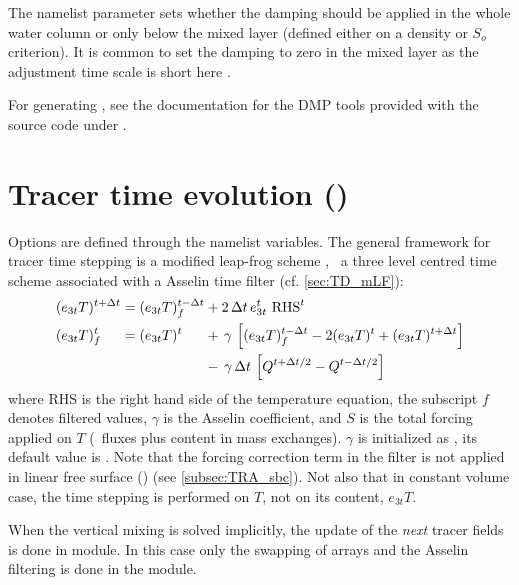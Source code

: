 \documentclass[../main/NEMO_manual]{subfiles}
\begin{document}
The namelist parameter  sets whether the damping should be applied in
the whole water column or only below the mixed layer (defined either on a density or $S_o$ criterion).
It is common to set the damping to zero in the mixed layer as the adjustment time scale is short here
\citep{madec.delecluse.ea_JPO96}.

For generating ,
see the documentation for the DMP tools provided with the source code under .

\section[Tracer time evolution (\textit{tranxt.F90})]{Tracer time evolution (\protect{})}
\label{sec:TRA_nxt}

Options are defined through the  namelist variables.
The general framework for tracer time stepping is a modified leap-frog scheme
\citep{leclair.madec_OM09}, \ie\ a three level centred time scheme associated with
a Asselin time filter (cf. \autoref{sec:TD_mLF}):
\begin{equation}
  \label{eq:TRA_nxt}
  \begin{alignedat}{5}
    &(e_{3t}T)^{t + \Delta t} &&= (e_{3t}T)_f^{t - \Delta t} &&+ 2 \, \Delta t \,e_{3t}^t \ \text{RHS}^t \\
    &(e_{3t}T)_f^t        &&= (e_{3t}T)^t            &&+ \, \gamma \, \left[ (e_{3t}T)_f^{t - \Delta t} - 2(e_{3t}T)^t + (e_{3t}T)^{t + \Delta t} \right] \\
    &                     &&                         &&- \, \gamma \, \Delta t \, \left[ Q^{t + \Delta t/2} - Q^{t - \Delta t/2} \right]
  \end{alignedat}
\end{equation}
where RHS is the right hand side of the temperature equation,
the subscript $f$ denotes filtered values, $\gamma$ is the Asselin coefficient,
and $S$ is the total forcing applied on $T$ (\ie\ fluxes plus content in mass exchanges).
$\gamma$ is initialized as , its default value is .
Note that the forcing correction term in the filter is not applied in linear free surface
() (see \autoref{subsec:TRA_sbc}).
Not also that in constant volume case, the time stepping is performed on $T$,
not on its content, $e_{3t}T$.

When the vertical mixing is solved implicitly,
the update of the \textit{next} tracer fields is done in  module.
In this case only the swapping of arrays and the Asselin filtering is done in the  module.
\end{document}
